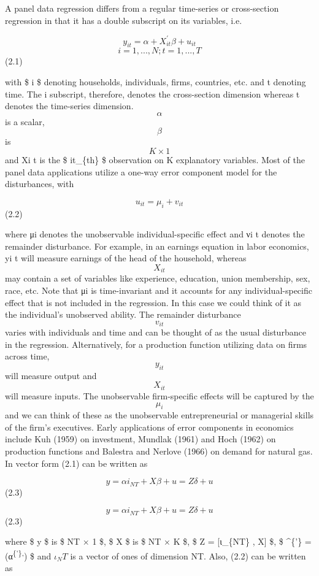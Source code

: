 \documentclass[
]{book}
\begin{document}
A panel data regression differs from a regular time-series or cross-section regression in that it has a double subscript on its variables, i.e.

\[  y_{it}= \alpha + X_{it}^{'} \beta + u_{it}                      \] \[ i=1, ... , N  ; t=1, ... ,T  \] (2.1)

with \$ i \$ denoting households, individuals, firms, countries, etc. and t denoting time. The i subscript, therefore, denotes the cross-section dimension whereas t denotes the time-series dimension. \[ \alpha  \] is a scalar, \[ \beta \] is \[ K × 1 \] and Xi t is the \$ it\_\{th\} \$ observation on K explanatory variables. Most of the panel data applications utilize a one-way error component model for the disturbances, with

\[ u_{it}= \mu_i +  v_{it}      \] (2.2)

where μi denotes the unobservable individual-specific effect and νi t denotes the remainder disturbance. For example, in an earnings equation in labor economics, yi t will measure earnings of the head of the household, whereas \[ X_{it} \] may contain a set of variables like experience, education, union membership, sex, race, etc. Note that μi is time-invariant and it accounts for any individual-specific effect that is not included in the regression. In this case we could think of it as the individual's unobserved ability. The remainder disturbance \[ v_{it} \] varies with individuals and time and can be thought of as the usual disturbance in the regression. Alternatively, for a production function utilizing data on firms across time, \[ y_{it} \] will measure output and \[ X_{it} \] will measure inputs. The unobservable firm-specific effects will be captured by the \[ \mu_i \] and we can think of these as the unobservable entrepreneurial or managerial skills of the firm's executives. Early applications of error components in economics include Kuh (1959) on investment, Mundlak (1961) and Hoch (1962) on production functions and Balestra and Nerlove (1966) on demand for natural gas. In vector form (2.1) can be written as

\[ y= \alpha i_{NT} + X \beta + u = Z \delta + u      \] (2.3)

\[ y= \alpha i_{NT} + X \beta + u = Z \delta + u      \] (2.3)

where \$ y \$ is \$ NT × 1 \$, \$ X \$ is \$ NT × K \$, \$ Z = {[}ι\_\{NT\} , X{]} \$, \$ \delta\^{}\{'\} = (α\textsuperscript{\{'\},}) \$ and \(ι_NT\) is a vector of ones of dimension NT. Also, (2.2) can be written as
\end{document}
